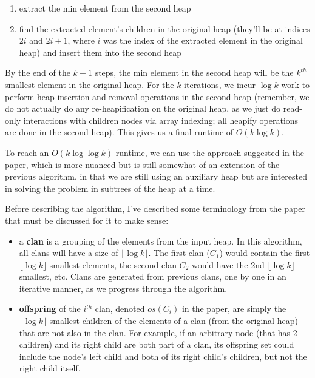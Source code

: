\documentclass[12pt]{article}
\begin{document}
\begin{enumerate}
    \begin{enumerate}
        \item extract the min element from the second heap
        \item find the extracted element's children in the original heap (they'll be at indices $2i$ and $2i + 1$, where 
        $i$ was the index of the extracted element in the original heap) and insert them into the second heap
    \end{enumerate}

    By the end of the $k - 1$ steps, the min element in the second heap will be the $k^{th}$ smallest element in the original 
    heap. For the $k$ iterations, we incur $\log k$ work to perform heap insertion and removal operations in the 
    second heap (remember, we do not actually do any re-heapification on the original heap, as we just do read-only interactions 
    with children nodes via array indexing; all heapify operations are done in the second heap). This gives us a final 
    runtime of $O(k\log k)$.

    To reach an $O(k\log \log k)$ runtime, we can use the approach suggested in the paper, which is more nuanced but is 
    still somewhat of an extension of the previous algorithm, in that we are still using an auxiliary heap but are 
    interested in solving the problem in subtrees of the heap at a time.

    Before describing the algorithm, I've described some terminology from the paper that must be discussed for it to make sense:

    \begin{itemize}
        \item a \textbf{clan} is a grouping of the elements from the input heap. In this algorithm, all clans will have a 
        size of $\lfloor \log k \rfloor$. The first clan ($C_1$) would contain the first $\lfloor \log k \rfloor$ smallest 
        elements, the second clan $C_2$ would have the 2nd $\lfloor \log k \rfloor$ smallest, etc. Clans are generated 
        from previous clans, one by one in an iterative manner, as we progress through the algorithm.
        
        \item \textbf{offspring} of the $i^{th}$ clan, denoted $os(C_i)$ in the paper, are simply the $\lfloor \log k \rfloor$ smallest 
        children of the elements of a clan (from the original heap) that are not also in the clan. For example, if an arbitrary 
        node (that has 2 children) and its right child are both part of a clan, its offspring set could include the node's left 
        child and both of its right child's children, but not the right child itself.


\end{itemize}
\end{enumerate}
\end{document}
